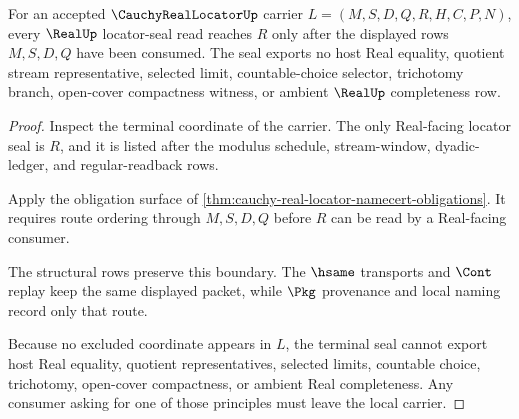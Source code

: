 \begin{theorem}
\label{thm:cauchy-real-locator-real-seal-nonescape}
For an accepted $\CauchyRealLocatorUp$ carrier $L=(M,S,D,Q,R,H,C,P,N)$, every $\RealUp$ locator-seal read reaches $R$ only after the displayed rows $M,S,D,Q$ have been consumed. The seal exports no host Real equality, quotient stream representative, selected limit, countable-choice selector, trichotomy branch, open-cover compactness witness, or ambient $\RealUp$ completeness row.
\end{theorem}
\begin{proof}
Inspect the terminal coordinate of the carrier. The only Real-facing locator seal is $R$, and it is listed after the modulus schedule, stream-window, dyadic-ledger, and regular-readback rows.

Apply the obligation surface of \autoref{thm:cauchy-real-locator-namecert-obligations}. It requires route ordering through $M,S,D,Q$ before $R$ can be read by a Real-facing consumer.

The structural rows preserve this boundary. The $\hsame$ transports and $\Cont$ replay keep the same displayed packet, while $\Pkg$ provenance and local naming record only that route.

Because no excluded coordinate appears in $L$, the terminal seal cannot export host Real equality, quotient representatives, selected limits, countable choice, trichotomy, open-cover compactness, or ambient Real completeness. Any consumer asking for one of those principles must leave the local carrier.
\end{proof}

